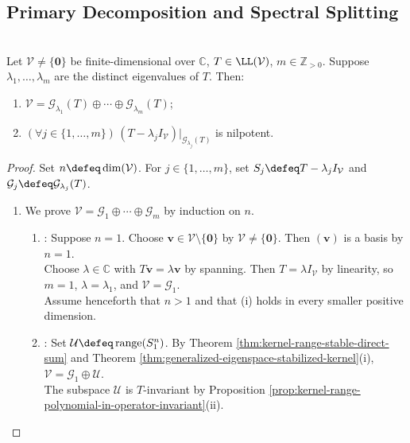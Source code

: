 \subsection{Primary Decomposition and Spectral Splitting}

\begin{theorem} \label{thm:complex-primary-decomposition-generalized-eigenspaces} \\
Let $\mathcal{V}\neq\{\mathbf{0}\}$ be finite-dimensional over $\mathbb{C}$,  $T\in\LL(\mathcal{V})$, $m\in\mathbb{Z}_{>0}$. Suppose $\lambda_1,\ldots,\lambda_m$ are the distinct eigenvalues of $T$. Then:
\begin{enumerate}[label=(\roman*)]
\setlength{\itemsep}{0pt}
\item $\mathcal{V}=\mathcal{G}_{\lambda_1}(T)\oplus\cdots\oplus \mathcal{G}_{\lambda_m}(T)$;
\item $(\forall j\in\{1,\ldots,m\})\,(T-\lambda_jI_{\mathcal{V}})|_{\mathcal{G}_{\lambda_j}(T)}$ is nilpotent.
\end{enumerate}
\begin{proof}
Set $n\defeq\dim(\mathcal{V})$. For $j\in\{1,\ldots,m\}$, set $S_j\defeq T-\lambda_jI_{\mathcal{V}}$ and $\mathcal{G}_j\defeq\mathcal{G}_{\lambda_j}(T)$.
\begin{enumerate}[label=(\roman*)]
\setlength{\itemsep}{0pt}
\item[$(i)$] We prove $\mathcal{V}=\mathcal{G}_1\oplus\cdots\oplus\mathcal{G}_m$ by induction on $n$.
\begin{enumerate}[label=(\alph*)]
\setlength{\itemsep}{0pt}
\item {}: Suppose $n=1$. Choose $\mathbf{v}\in\mathcal{V}\setminus\{\mathbf{0}\}$ by $\mathcal{V}\neq\{\mathbf{0}\}$. Then $(\mathbf{v})$ is a basis by $n=1$.\\
Choose $\lambda\in\mathbb{C}$ with $T\mathbf{v}=\lambda\mathbf{v}$ by spanning. Then $T=\lambda I_{\mathcal{V}}$ by linearity, so $m=1$, $\lambda=\lambda_1$, and $\mathcal{V}=\mathcal{G}_1$.\\
Assume henceforth that $n>1$ and that (i) holds in every smaller positive dimension.
\item {}: Set $\mathcal{U}\defeq\operatorname{range}(S_1^n)$. By Theorem \ref{thm:kernel-range-stable-direct-sum} and Theorem \ref{thm:generalized-eigenspace-stabilized-kernel}(i), $\mathcal{V}=\mathcal{G}_1\oplus\mathcal{U}$.\\
The subspace $\mathcal{U}$ is $T$-invariant by Proposition \ref{prop:kernel-range-polynomial-in-operator-invariant}(ii).\\

\end{enumerate}
\end{enumerate}
\end{proof}
\end{theorem}
